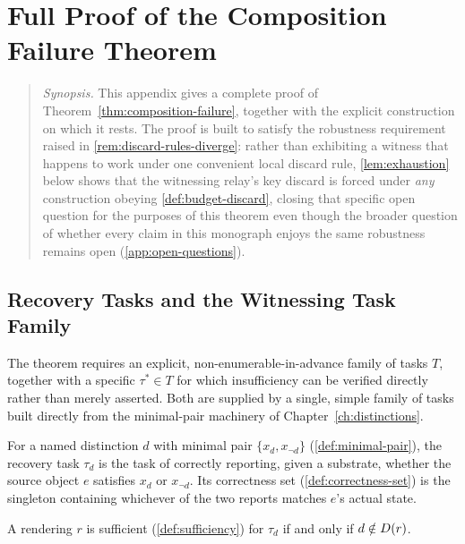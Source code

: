 \chapter{Full Proof of the Composition Failure Theorem}
\label{app:proof}

\begin{quotation}
\noindent\textit{Synopsis.} This appendix gives a complete proof of
Theorem~\ref{thm:composition-failure}, together with the explicit
construction on which it rests. The proof is built to satisfy the
robustness requirement raised in \cref{rem:discard-rules-diverge}: rather
than exhibiting a witness that happens to work under one convenient local
discard rule, \cref{lem:exhaustion} below shows that the witnessing
relay's key discard is forced under \emph{any} construction obeying
\cref{def:budget-discard}, closing that specific open question for the
purposes of this theorem even though the broader question of whether
every claim in this monograph enjoys the same robustness remains open
(\cref{app:open-questions}).
\end{quotation}

\section{Recovery Tasks and the Witnessing Task Family}

The theorem requires an explicit, non-enumerable-in-advance family of
tasks $T$, together with a specific $\tau^* \in T$ for which insufficiency
can be verified directly rather than merely asserted. Both are supplied by
a single, simple family of tasks built directly from the minimal-pair
machinery of Chapter~\ref{ch:distinctions}.

\begin{definition}
\label{def:recovery-task}
For a named distinction $d$ with minimal pair $\{x_d, x_{\neg d}\}$
(\cref{def:minimal-pair}), the recovery task $\tau_d$ is the task of
correctly reporting, given a substrate, whether the source object $e$
satisfies $x_d$ or $x_{\neg d}$. Its correctness set
(\cref{def:correctness-set}) is the singleton containing whichever of the
two reports matches $e$'s actual state.
\end{definition}

\begin{lemma}
\label{lem:recovery-sufficiency}
A rendering $r$ is sufficient (\cref{def:sufficiency}) for $\tau_d$ if and
only if $d \notin D(r)$.
\end{lemma}

